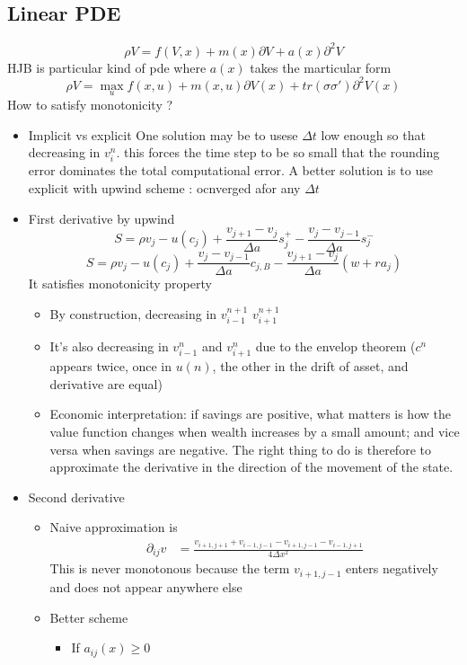 \documentclass[english]{article}
\begin{document}
\subsection{Linear PDE}
$$\rho V = f(V, x) + m(x) \partial V + a(x) \partial^2V$$ 
HJB is particular kind of pde where $a(x)$ takes the marticular form
$$\rho V = \max_{u} f(x, u) + m(x, u) \partial V(x) + tr(\sigma \sigma') \partial^2 V(x)$$
How to satisfy monotonicity ?
\begin{itemize}
	\item Implicit vs explicit One solution may be to usese $\Delta t$ low enough so that decreasing in $v_{i}^{n}$. this forces the time step to be so small	that the rounding error dominates the total computational error.
	A better solution is to use explicit with upwind scheme : ocnverged afor any $\Delta t$
	\item First derivative by upwind
	$$S = \rho v_j - u(c_j) + \frac{v_{j+1}-v_{j}}{\Delta a} s_{j}^+ - \frac{v_j-v_{j-1}}{\Delta a} s_{j}^-$$
	$$S = \rho v_j - u(c_j) + \frac{v_j-v_{j-1}}{\Delta a} c_{j, B} - \frac{v_{j+1}-v_j}{\Delta a} (w + ra_j)$$
	It satisfies monotonicity property
	\begin{itemize}
		\item By construction, decreasing in $v_{i-1}^{n+1}$ $v_{i+1}^{n+1}$
		\item It's also decreasing in $v_{i-1}^{n}$ and $v_{i+1}^{n}$ due to the envelop theorem ($c^n$ appears twice, once in $u(n)$, the other in the drift of asset, and derivative are equal)
		\item  Economic interpretation: if savings are positive, what matters is how the value function changes when wealth increases by a small amount; and vice versa when savings are negative. The right thing to do is therefore to approximate the derivative in the direction of the movement of the state.
	\end{itemize}
	\item Second derivative
	\begin{itemize}
		\item Naive approximation is
		\begin{align*}
			\partial_{ij}v&=\frac{v_{i+1, j+1} + v_{i-1, j-1} - v_{i+1, j-1} - v_{i-1, j+1}}{4\Delta x^2}
		\end{align*}
		This is never monotonous because the term $v_{i+1, j-1}$ enters negatively and does not appear anywhere else
		\item Better scheme
		\begin{itemize}
			\item If $a_{ij}(x) \geq 0$

\end{itemize}
\end{itemize}
\end{itemize}
\end{document}
